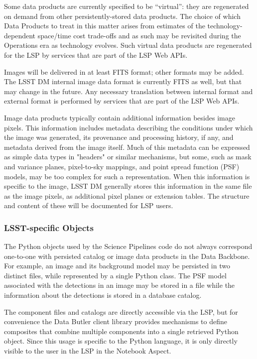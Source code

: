 Some data products are currently specified to be ``virtual'': they are
regenerated on demand from other persistently-stored data products.
The choice of which Data Products to treat in this matter arises from 
estimates of the technology-dependent space/time cost trade-offs and as
such may be revisited during the Operations era as technology evolves.
Such virtual data products are regenerated for the LSP by services that are
part of the LSP Web APIs.

Images will be delivered in at least FITS format; other formats may be added.
The LSST DM internal image data format is currently FITS as well, but that may
change in the future.  Any necessary translation between internal format and
external format is performed by services that are part of the LSP Web APIs.

Image data products typically contain additional information besides image
pixels.  This information includes metadata describing the conditions under
which the image was generated, its provenance and processing history, if any,
and metadata derived from the image itself.  Much of this metadata can be
expressed as simple data types in "headers" or similar mechanisms, but some,
such as mask and variance planes, pixel-to-sky mappings, and point spread
function (PSF) models, may be too complex for such a representation.  When this
information is specific to the image, LSST DM generally stores this information
in the same file as the image pixels, as additional pixel planes or extension
tables.  The structure and content of these will be documented for LSP users.

\subsubsection{LSST-specific Objects}\label{lsst-specific-objects}

The Python objects used by the Science Pipelines code do not always
correspond one-to-one with persisted catalog or image data products in the
Data Backbone.
For example, an image and its background model may be persisted
in two distinct files, while represented by a single Python class.
The PSF model associated with the detections in an
image may be stored in a file while the information about the detections is
stored in a database catalog.

The component files and catalogs are directly accessible via the LSP, but
for convenience the Data Butler client library provides mechanisms to define
composites that combine multiple components into a single retrieved Python
object.  Since this usage is specific to the Python language, it is only
directly visible to the user in the LSP in the Notebook Aspect.

